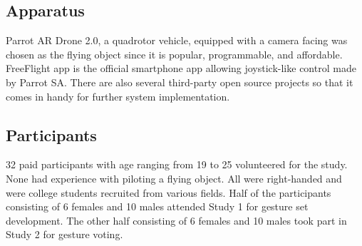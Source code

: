 \documentclass{sigchi}
\begin{document}
\subsection{Apparatus}

Parrot AR Drone 2.0, a quadrotor vehicle, equipped with a camera facing was chosen as the flying object since it is popular, programmable, and affordable. FreeFlight app is the official smartphone app allowing joystick-like control made by Parrot SA. There are also several third-party open source projects so that it comes in handy for further system implementation.

\subsection{Participants}

32 paid participants with age ranging from 19 to 25 volunteered for the study. None had experience with piloting a flying object. All were right-handed and were college students recruited from various fields. Half of the participants consisting of 6 females and 10 males attended Study 1 for gesture set development. The other half consisting of 6 females and 10 males took part in Study 2 for gesture voting. 


\end{document}
